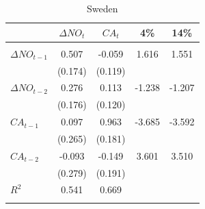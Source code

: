 \documentclass[12pt]{article}
\begin{document}
\begin{table}[h!]
\begin{center}
\caption{Sweden}			
\begin{threeparttable}

\begin{tabular}{lcccc}
&$ \Delta NO_{t} $        &$ CA_{t} $				 &4\%				&14\% \\
\hline \\[-1.8ex]

$ \Delta NO_{t - 1} $   & 0.507    &-0.059     & 1.616 	 & 1.551	  \\
				                &(0.174)   &(0.119)    &         &         \\
$ \Delta NO_{t - 2} $   & 0.276    & 0.113     &-1.238   &-1.207   \\
				                &(0.176)   &(0.120)    &         &         \\
$ CA_{t - 1} $          & 0.097    & 0.963     &-3.685   &-3.592   \\
				                &(0.265)   &(0.181)    &         &         \\
$ CA_{t - 2} $          &-0.093    &-0.149     & 3.601   & 3.510   \\
				                &(0.279)   &(0.191)    &         &         \\
$ R^{2} $				        & 0.541    & 0.669     &         &         \\
\hline \\[-1.8ex]


\end{tabular}


\end{threeparttable}
\end{center}
\end{table}
\end{document}
